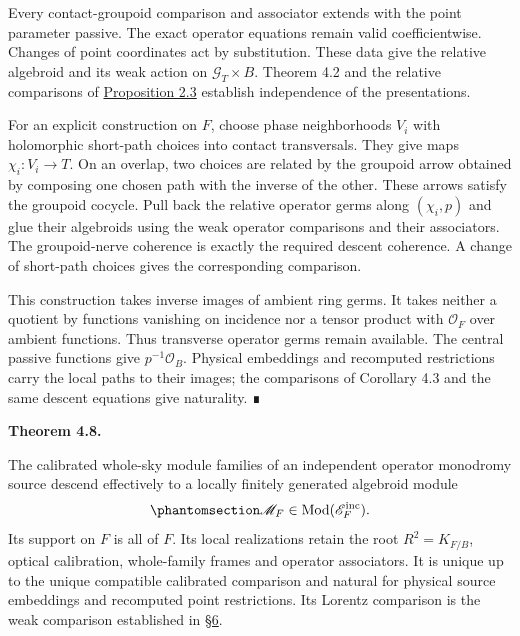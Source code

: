 \documentclass[
  english,
  11pt,
  reqno]{amsart}
\makeatletter
\newcommand{\pandocstatementheading}[1]{%
  \par\addpenalty{\@beginparpenalty}%
  \addvspace{.5\baselineskip plus .2\baselineskip minus .2\baselineskip}%
  {\normalfont\bfseries #1\par}%
  \nobreak\@afterindenttrue\@afterheading
}
\makeatother
\begin{document}
Every contact-groupoid comparison and associator extends with the point
parameter passive. The exact operator equations remain valid
coefficientwise. Changes of point coordinates act by substitution. These
data give the relative algebroid and its weak action on
\(\mathcal G_T\times B\). Theorem 4.2 and the relative comparisons of
\hyperref[prop:independent-local-operator-input]{Proposition 2.3}
establish independence of the presentations.

For an explicit construction on \(F\), choose phase neighborhoods
\(V_i\) with holomorphic short-path choices into contact transversals.
They give maps \(\chi_i:V_i\to T\). On an overlap, two choices are
related by the groupoid arrow obtained by composing one chosen path with
the inverse of the other. These arrows satisfy the groupoid cocycle.
Pull back the relative operator germs along \((\chi_i,p)\) and glue
their algebroids using the weak operator comparisons and their
associators. The groupoid-nerve coherence is exactly the required
descent coherence. A change of short-path choices gives the
corresponding comparison.

This construction takes inverse images of ambient ring germs. It takes
neither a quotient by functions vanishing on incidence nor a tensor
product with \(\mathcal O_F\) over ambient functions. Thus transverse
operator germs remain available. The central passive functions give
\(p^{-1}\mathcal O_B\). Physical embeddings and recomputed restrictions
carry the local paths to their images; the comparisons of Corollary 4.3
and the same descent equations give naturality. ∎

\pandocstatementheading{\protect{}\label{thm:global-parametrized-point-module-family}Theorem 4.8.}

The calibrated whole-sky module families of an independent operator
monodromy source descend effectively to a locally finitely generated
algebroid module
\begin{equation}\protect\phantomsection\label{eq:global-parametrized-point-module-family}{
\mathscr M_F\in\operatorname{Mod}(\mathscr E_F^{\mathrm{inc}}).
}\end{equation} Its support on \(F\) is all of \(F\). Its local
realizations retain the root \(R^2=K_{F/B}\), optical calibration,
whole-family frames and operator associators. It is unique up to the
unique compatible calibrated comparison and natural for physical source
embeddings and recomputed point restrictions. Its Lorentz comparison is
the weak comparison established in \hyperref[sec:spin-reality-v08]{§6}.
\end{document}
